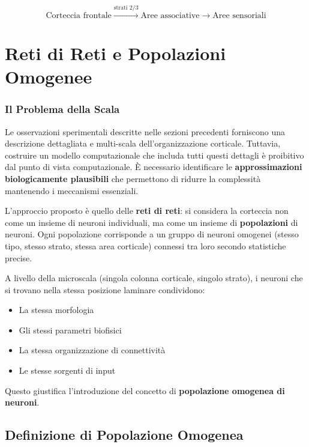 \begin{equation}
\text{Corteccia frontale} \xrightarrow{\text{strati 2/3}} \text{Aree associative} \xrightarrow{} \text{Aree sensoriali}
\end{equation}

\newpage
\section{Reti di Reti e Popolazioni Omogenee}

\subsubsection{Il Problema della Scala}

Le osservazioni sperimentali descritte nelle sezioni precedenti forniscono una descrizione dettagliata e multi-scala dell'organizzazione corticale. Tuttavia, costruire un modello computazionale che includa tutti questi dettagli è proibitivo dal punto di vista computazionale. È necessario identificare le \textbf{approssimazioni biologicamente plausibili} che permettono di ridurre la complessità mantenendo i meccanismi essenziali.

L'approccio proposto è quello delle \textbf{reti di reti}: si considera la corteccia non come un insieme di neuroni individuali, ma come un insieme di \textbf{popolazioni} di neuroni. Ogni popolazione corrisponde a un gruppo di neuroni omogenei (stesso tipo, stesso strato, stessa area corticale) connessi tra loro secondo statistiche precise.

A livello della microscala (singola colonna corticale, singolo strato), i neuroni che si trovano nella stessa posizione laminare condividono:

\begin{itemize}
    \item La stessa morfologia
    \item Gli stessi parametri biofisici
    \item La stessa organizzazione di connettività
    \item Le stesse sorgenti di input
\end{itemize}

Questo giustifica l'introduzione del concetto di \textbf{popolazione omogenea di neuroni}.



\subsection{Definizione di Popolazione Omogenea}

